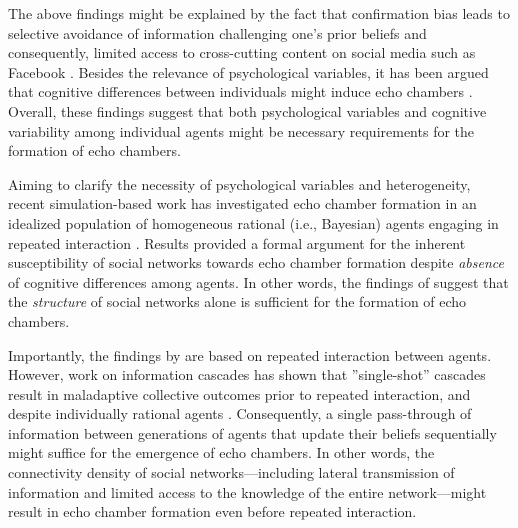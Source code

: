 \documentclass[doc,floatsintext]{apa6}
\begin{document}
The above findings might be explained by the fact that confirmation bias leads to selective avoidance of information challenging one's prior beliefs and consequently, limited access to cross-cutting content on social media such as Facebook \citep{bakshy2015exposure, ngampruetikorn2016bias}. Besides the relevance of psychological variables, it has been argued that cognitive differences between individuals might induce echo chambers \citep{barkun2013culture}. Overall, these findings suggest that both psychological variables and cognitive variability among individual agents might be necessary requirements for the formation of echo chambers.

Aiming to clarify the necessity of psychological variables and heterogeneity, recent simulation-based work has investigated echo chamber formation in an idealized population of homogeneous rational (i.e., Bayesian) agents engaging in repeated interaction \citep{madsen2018large, madsen2017growing}. Results provided a formal argument for the inherent susceptibility of social networks towards echo chamber formation despite \emph{absence} of cognitive differences among agents. In other words, the findings of \cite{madsen2018large} suggest that the \textit{structure} of social networks alone is sufficient for the formation of echo chambers. 

Importantly, the findings by \citep{madsen2018large, madsen2017growing} are based on repeated interaction between agents. However, work on information cascades has shown that ''single-shot'' cascades result in maladaptive collective outcomes prior to repeated interaction, and despite individually rational agents \citep{bikhchandani1992theory, pilditch2017opinion}. Consequently, a single pass-through of information between generations of agents that update their beliefs sequentially might suffice for the emergence of echo chambers. In other words, the connectivity density of social networks---including lateral transmission of information and limited access to the knowledge of the entire network---might result in echo chamber formation even before repeated interaction.
\end{document}
